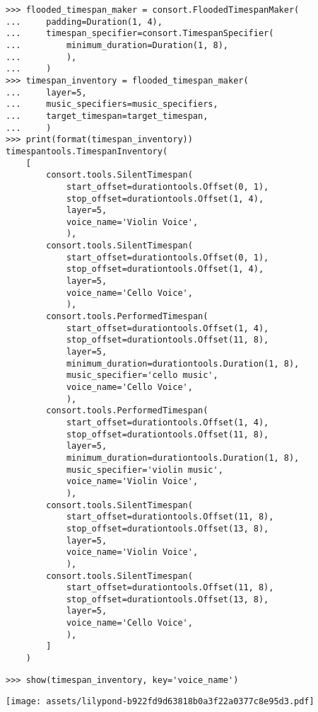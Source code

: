 \begin{singlespacing}
\vspace{-0.5\baselineskip}
\begin{lstlisting}
>>> flooded_timespan_maker = consort.FloodedTimespanMaker(
...     padding=Duration(1, 4),
...     timespan_specifier=consort.TimespanSpecifier(
...         minimum_duration=Duration(1, 8),
...         ),
...     )
>>> timespan_inventory = flooded_timespan_maker(
...     layer=5,
...     music_specifiers=music_specifiers,
...     target_timespan=target_timespan,
...     )
>>> print(format(timespan_inventory))
timespantools.TimespanInventory(
    [
        consort.tools.SilentTimespan(
            start_offset=durationtools.Offset(0, 1),
            stop_offset=durationtools.Offset(1, 4),
            layer=5,
            voice_name='Violin Voice',
            ),
        consort.tools.SilentTimespan(
            start_offset=durationtools.Offset(0, 1),
            stop_offset=durationtools.Offset(1, 4),
            layer=5,
            voice_name='Cello Voice',
            ),
        consort.tools.PerformedTimespan(
            start_offset=durationtools.Offset(1, 4),
            stop_offset=durationtools.Offset(11, 8),
            layer=5,
            minimum_duration=durationtools.Duration(1, 8),
            music_specifier='cello music',
            voice_name='Cello Voice',
            ),
        consort.tools.PerformedTimespan(
            start_offset=durationtools.Offset(1, 4),
            stop_offset=durationtools.Offset(11, 8),
            layer=5,
            minimum_duration=durationtools.Duration(1, 8),
            music_specifier='violin music',
            voice_name='Violin Voice',
            ),
        consort.tools.SilentTimespan(
            start_offset=durationtools.Offset(11, 8),
            stop_offset=durationtools.Offset(13, 8),
            layer=5,
            voice_name='Violin Voice',
            ),
        consort.tools.SilentTimespan(
            start_offset=durationtools.Offset(11, 8),
            stop_offset=durationtools.Offset(13, 8),
            layer=5,
            voice_name='Cello Voice',
            ),
        ]
    )
\end{lstlisting}
\begin{lstlisting}
>>> show(timespan_inventory, key='voice_name')
\end{lstlisting}
\noindent\texttt{[image: assets/lilypond-b922fd9d63818b0a3f22a0377c8e95d3.pdf]}
\end{singlespacing}

